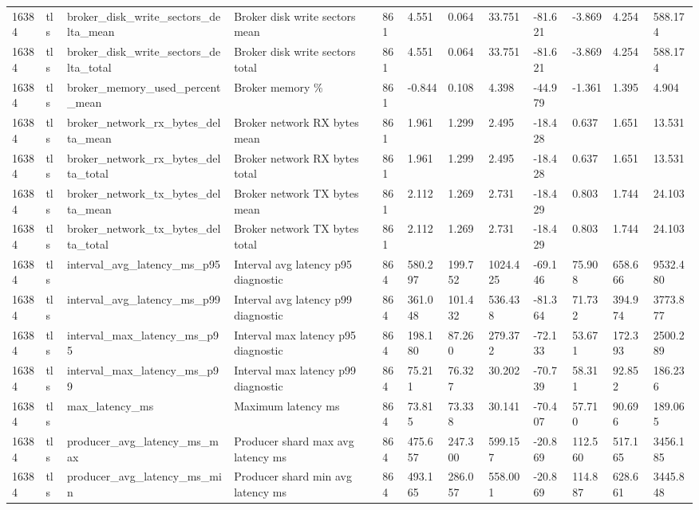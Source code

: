 \begin{longtable}{llllllllllll}
16384 & tls & broker\_disk\_write\_sectors\_delta\_mean & Broker disk write sectors mean & 861 & 4.551 & 0.064 & 33.751 & -81.621 & -3.869 & 4.254 & 588.174 \\
16384 & tls & broker\_disk\_write\_sectors\_delta\_total & Broker disk write sectors total & 861 & 4.551 & 0.064 & 33.751 & -81.621 & -3.869 & 4.254 & 588.174 \\
16384 & tls & broker\_memory\_used\_percent\_mean & Broker memory \% & 861 & -0.844 & 0.108 & 4.398 & -44.979 & -1.361 & 1.395 & 4.904 \\
16384 & tls & broker\_network\_rx\_bytes\_delta\_mean & Broker network RX bytes mean & 861 & 1.961 & 1.299 & 2.495 & -18.428 & 0.637 & 1.651 & 13.531 \\
16384 & tls & broker\_network\_rx\_bytes\_delta\_total & Broker network RX bytes total & 861 & 1.961 & 1.299 & 2.495 & -18.428 & 0.637 & 1.651 & 13.531 \\
16384 & tls & broker\_network\_tx\_bytes\_delta\_mean & Broker network TX bytes mean & 861 & 2.112 & 1.269 & 2.731 & -18.429 & 0.803 & 1.744 & 24.103 \\
16384 & tls & broker\_network\_tx\_bytes\_delta\_total & Broker network TX bytes total & 861 & 2.112 & 1.269 & 2.731 & -18.429 & 0.803 & 1.744 & 24.103 \\
16384 & tls & interval\_avg\_latency\_ms\_p95 & Interval avg latency p95 diagnostic & 864 & 580.297 & 199.752 & 1024.425 & -69.146 & 75.908 & 658.666 & 9532.480 \\
16384 & tls & interval\_avg\_latency\_ms\_p99 & Interval avg latency p99 diagnostic & 864 & 361.048 & 101.432 & 536.438 & -81.364 & 71.732 & 394.974 & 3773.877 \\
16384 & tls & interval\_max\_latency\_ms\_p95 & Interval max latency p95 diagnostic & 864 & 198.180 & 87.260 & 279.372 & -72.133 & 53.671 & 172.393 & 2500.289 \\
16384 & tls & interval\_max\_latency\_ms\_p99 & Interval max latency p99 diagnostic & 864 & 75.211 & 76.327 & 30.202 & -70.739 & 58.311 & 92.852 & 186.236 \\
16384 & tls & max\_latency\_ms & Maximum latency ms & 864 & 73.815 & 73.338 & 30.141 & -70.407 & 57.710 & 90.696 & 189.065 \\
16384 & tls & producer\_avg\_latency\_ms\_max & Producer shard max avg latency ms & 864 & 475.657 & 247.300 & 599.157 & -20.869 & 112.560 & 517.165 & 3456.185 \\
16384 & tls & producer\_avg\_latency\_ms\_min & Producer shard min avg latency ms & 864 & 493.165 & 286.057 & 558.001 & -20.869 & 114.887 & 628.661 & 3445.848 \\

\end{longtable}
